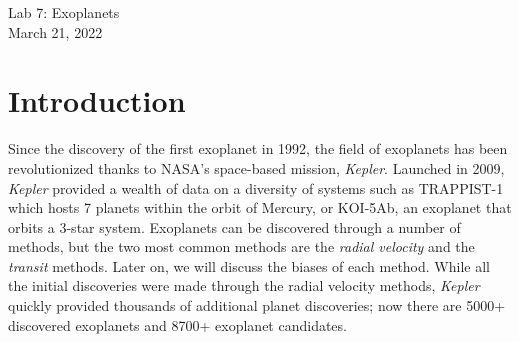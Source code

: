 \documentclass[11pt]{article}
\begin{document}
\begin{center}
\huge{Lab 7: Exoplanets}\\ \medskip \Large{March 21, 2022}
\end{center}

\section{Introduction}

Since the discovery of the first exoplanet in 1992, the field of exoplanets has been revolutionized thanks to NASA's space-based mission, \textit{Kepler}. Launched in 2009, \textit{Kepler} provided a wealth of data on a diversity of systems such as TRAPPIST-1 which hosts 7 planets within the orbit of Mercury, or KOI-5Ab, an exoplanet that orbits a 3-star system. Exoplanets can be discovered through a number of methods, but the two most common methods are the \textit{radial velocity} and the \textit{transit} methods. Later on, we will discuss the biases of each method. While all the initial discoveries were made through the radial velocity methods, \textit{Kepler} quickly provided thousands of additional planet discoveries; now there are 5000+ discovered exoplanets and 8700+ exoplanet candidates. 
\end{document}
